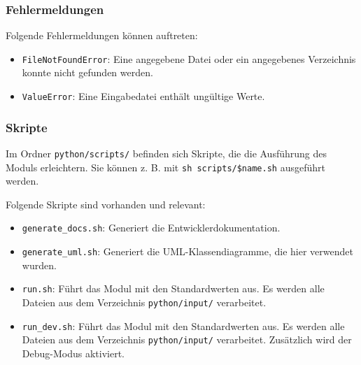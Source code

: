 \subsubsection{Fehlermeldungen}
\label{sssec:fehlermeldungen}

Folgende Fehlermeldungen können auftreten:
\begin{itemize}
    \item \texttt{FileNotFoundError}: Eine angegebene Datei oder ein angegebenes Verzeichnis konnte nicht gefunden werden.
    \item \texttt{ValueError}: Eine Eingabedatei enthält ungültige Werte.
\end{itemize}

\subsubsection{Skripte}
\label{sssec:skripte}

Im Ordner \texttt{python/scripts/} befinden sich Skripte, die die Ausführung des Moduls erleichtern.
Sie können z. B. mit \texttt{sh scripts/\$name.sh} ausgeführt werden.

Folgende Skripte sind vorhanden und relevant:
\begin{itemize}
    \item \texttt{generate\_docs.sh}: Generiert die Entwicklerdokumentation.
    \item \texttt{generate\_uml.sh}: Generiert die UML-Klassendiagramme, die hier verwendet wurden.
    \item \texttt{run.sh}: Führt das Modul mit den Standardwerten aus. Es werden alle Dateien aus dem Verzeichnis \texttt{python/input/} verarbeitet.
    \item \texttt{run\_dev.sh}: Führt das Modul mit den Standardwerten aus. Es werden alle Dateien aus dem Verzeichnis \texttt{python/input/} verarbeitet.
          Zusätzlich wird der Debug-Modus aktiviert.
\end{itemize}
